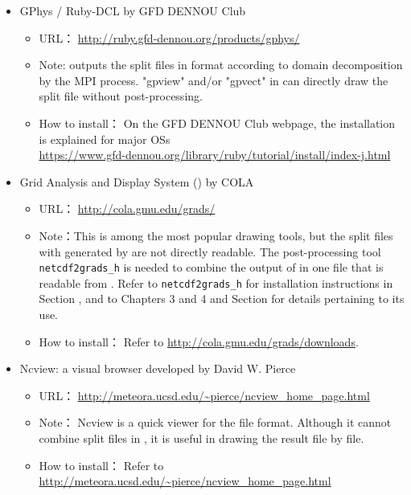 \begin{itemize}
\item GPhys / Ruby-DCL by GFD DENNOU Club
 \begin{itemize}
  \item URL： \url{http://ruby.gfd-dennou.org/products/gphys/}
  \item Note: \scalelib outputs the split files 
  in {\netcdf} format according to domain decomposition by the MPI process.
  "gpview" and/or "gpvect" in {\gphys} can directly draw the split file without post-processing.
  \item How to install：
  On the GFD DENNOU Club webpage, the installation is explained for major OSs\\
  \url{https://www.gfd-dennou.org/library/ruby/tutorial/install/index-j.html}\\
   \end{itemize}
\item Grid Analysis and Display System (\grads) by COLA
 \begin{itemize}
  \item URL： \url{http://cola.gmu.edu/grads/}
  \item Note：This is among the most popular drawing tools,
  but the split files with {\netcdf} generated by \scalelib are not directly readable.
  The post-processing tool \verb|netcdf2grads_h| is needed to combine the output of \scalelib in one file that is readable from \grads. Refer to \verb|netcdf2grads_h| for installation instructions in Section \label{sec:source_net2g}, and to Chapters 3 and 4 and Section \label{sec:net2g} for details pertaining to its use.
  \item How to install： Refer to \url{http://cola.gmu.edu/grads/downloads}.
 \end{itemize}
\item Ncview: a {\netcdf} visual browser developed by David W. Pierce
 \begin{itemize}
  \item URL： \url{http://meteora.ucsd.edu/~pierce/ncview_home_page.html}
  \item Note： Ncview is a quick viewer for the {\netcdf} file format.
  Although it cannot combine split files in \scalelib, it is useful in drawing the result file by file.
  \item How to install： Refer to \url{http://meteora.ucsd.edu/~pierce/ncview_home_page.html}
 \end{itemize}
\end{itemize}


